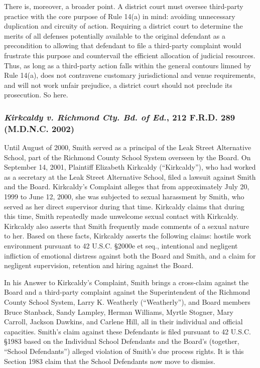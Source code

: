 \documentclass[11pt,letterpaper,twoside]{article}
\begin{document}
There is, moreover, a broader point. A district court must oversee
third-party practice with the core purpose of Rule 14(a) in mind:
avoiding unnecessary duplication and circuity of action. Requiring a
district court to determine the merits of all defenses potentially
available to the original defendant as a precondition to allowing that
defendant to file a third-party complaint would frustrate this purpose
and countervail the efficient allocation of judicial resources. Thus, as
long as a third-party action falls within the general contours limned by
Rule 14(a), does not contravene customary jurisdictional and venue
requirements, and will not work unfair prejudice, a district court
should not preclude its prosecution. So here.

\subsubsection{\texorpdfstring{\emph{Kirkcaldy v. Richmond Cty. Bd. of
Ed.}, 212 F.R.D. 289 (M.D.N.C.
2002)}{Kirkcaldy v. Richmond Cty. Bd. of Ed., 212 F.R.D. 289 (M.D.N.C. 2002)}}\label{kirkcaldyrichmondctybd_mdnc2002-1}

Until August of 2000, Smith served as a principal of the Leak Street
Alternative School, part of the Richmond County School System overseen
by the Board. On September 14, 2001, Plaintiff Elizabeth Kirkcaldy
(``Kirkcaldy''), who had worked as a secretary at the Leak Street
Alternative School, filed a lawsuit against Smith and the Board.
Kirkcaldy's Complaint alleges that from approximately July 20, 1999 to
June 12, 2000, she was subjected to sexual harassment by Smith, who
served as her direct supervisor during that time. Kirkcaldy claims that
during this time, Smith repeatedly made unwelcome sexual contact with
Kirkcaldy. Kirkcaldy also asserts that Smith frequently made comments of
a sexual nature to her. Based on these facts, Kirkcaldy asserts the
following claims: hostile work environment pursuant to 42 U.S.C. §2000e
et seq., intentional and negligent infliction of emotional distress
against both the Board and Smith, and a claim for negligent supervision,
retention and hiring against the Board.

In his Answer to Kirkcaldy's Complaint, Smith brings a cross-claim
against the Board and a third-party complaint against the Superintendent
of the Richmond County School System, Larry K. Weatherly
(``Weatherly''), and Board members Bruce Stanback, Sandy Lampley, Herman
Williams, Myrtle Stogner, Mary Carroll, Jackson Dawkins, and Carlene
Hill, all in their individual and official capacities. Smith's claim
against these Defendants is filed pursuant to 42 U.S.C. §1983 based on
the Individual School Defendants and the Board's (together, ``School
Defendants'') alleged violation of Smith's due process rights. It is
this Section 1983 claim that the School Defendants now move to dismiss.
\end{document}
